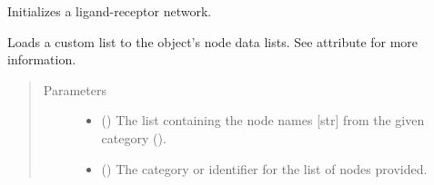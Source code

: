 \documentclass[letterpaper,10pt,english]{sphinxmanual}
\begin{document}
\begin{fulllineitems}

\begin{fulllineitems}
\label{\detokenize{reference:pypath.main.PyPath.load_ligand_receptor_network}}
Initializes a ligand-receptor network.

\end{fulllineitems}


\begin{fulllineitems}
\label{\detokenize{reference:pypath.main.PyPath.load_list}}
Loads a custom list to the object’s node data lists. See
 attribute for more
information.
\begin{quote}\begin{description}
\item[{Parameters}] \leavevmode\begin{itemize}
\item {} 
 () \textendash{} The list containing the node names {[}str{]} from the given
category ().

\item {} 
 () \textendash{} The category or identifier for the list of nodes provided.

\end{itemize}

\end{description}\end{quote}

\end{fulllineitems}



\end{fulllineitems}
\end{document}
